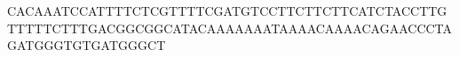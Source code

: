 \documentclass[a4paper,11pt]{article}
\title{}
\author{}
\begin{document}
CACAAATCCATTTTCTCGTTTTCGATGTCCTTCTTCTTCATCTACCTTGTTTTTCTTTGACGGCGGCATACAAAAAAATAAAACAAAACAGAACCCTAGATGGGTGTGATGGGCT
\end{document}

